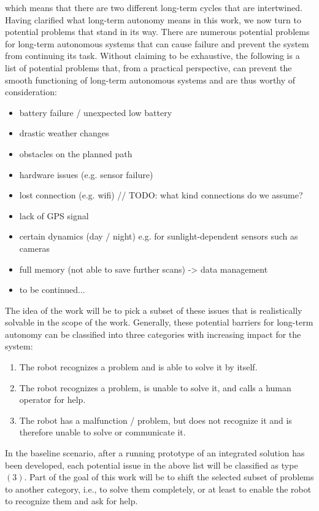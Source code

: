 \documentclass[german, master, expose, latin1]{base/thesis_KBS}
\begin{document}
which means that there are two different long-term cycles that are intertwined.\newline
Having clarified what long-term autonomy means in this work, we now turn to potential problems that stand in its way.
There are numerous potential problems for long-term autonomous systems that can cause failure and prevent the system from continuing its task.
Without claiming to be exhaustive, the following is a list of potential problems that, from a practical perspective, can prevent the smooth functioning
of long-term autonomous systems and are thus worthy of consideration:
\begin{itemize}
    \item battery failure / unexpected low battery
    \item drastic weather changes
    \item obstacles on the planned path
    \item hardware issues (e.g. sensor failure)
    \item lost connection (e.g. wifi) // TODO: what kind connections do we assume?
    \item lack of GPS signal
    \item certain dynamics (day / night) e.g. for sunlight-dependent sensors such as cameras
    \item full memory (not able to save further scans) -> data management
    \item to be continued...
\end{itemize}

The idea of the work will be to pick a subset of these issues that is realistically solvable in the scope of the work.
Generally, these potential barriers for long-term autonomy can be classified into three categories with increasing impact for the system:
\begin{enumerate}
    \item The robot recognizes a problem and is able to solve it by itself.
    \item The robot recognizes a problem, is unable to solve it, and calls a human operator for help.
    \item The robot has a malfunction / problem, but does not recognize it and is therefore unable to solve or communicate it.
\end{enumerate}

In the baseline scenario, after a running prototype of an integrated solution has been developed, each potential issue in the above list will be classified as type $(3)$.
Part of the goal of this work will be to shift the selected subset of problems to another category, i.e., to solve them completely, 
or at least to enable the robot to recognize them and ask for help.
\end{document}

